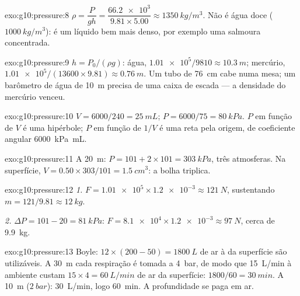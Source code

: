 \begin{solution}{exo:g10:pressure:8}
$\rho = \dfrac{P}{g h} = \dfrac{\num{66.2e3}}{9.81 \times 5.00}
\approx \qty{1350}{kg/m^3}$. Não é água doce ($\qty{1000}{kg/m^3}$): é um
líquido bem mais denso, por exemplo uma salmoura concentrada.
\end{solution}

\begin{solution}{exo:g10:pressure:9}
$h = P_0/(\rho g)$: água, $\num{1.01e5}/9810 \approx \qty{10.3}{m}$;
mercúrio, $\num{1.01e5}/(13600 \times 9.81) \approx \qty{0.76}{m}$. Um
tubo de \qty{76}{cm} cabe numa mesa; um barômetro de água de \qty{10}{m}
precisa de uma caixa de escada --- a densidade do mercúrio venceu.
\end{solution}

\begin{solution}{exo:g10:pressure:10}
$V = 6000/240 = \qty{25}{mL}$; $P = 6000/75 = \qty{80}{kPa}$. $P$ em
função de $V$ é uma hipérbole; $P$ em função de $1/V$ é uma reta pela
origem, de coeficiente angular \qty{6000}{kPa.mL}.
\end{solution}

\begin{solution}{exo:g10:pressure:11}
A \qty{20}{m}: $P = 101 + 2 \times 101 = \qty{303}{kPa}$, três
atmosferas. Na superfície,
$V = 0.50 \times 303/101 = \qty{1.5}{cm^3}$: a bolha triplica.
\end{solution}

\begin{solution}{exo:g10:pressure:12}
\emph{1.} $F = \num{1.01e5} \times \num{1.2e-3} \approx \qty{121}{N}$,
sustentando $m = 121/9.81 \approx \qty{12}{kg}$.

\emph{2.} $\Delta P = 101 - 20 = \qty{81}{kPa}$:
$F = \num{8.1e4} \times \num{1.2e-3} \approx \qty{97}{N}$, cerca de
\qty{9.9}{kg}.
\end{solution}

\begin{solution}{exo:g10:pressure:13}
Boyle: $12 \times (200 - 50) = \qty{1800}{L}$ de ar à  da
superfície são utilizáveis. A \qty{30}{m} cada respiração é tomada a
\qty{4}{bar}, de modo que \qty{15}{L/min} à  ambiente custam
$15 \times 4 = \qty{60}{L/min}$ de ar da superfície:
$1800/60 = \qty{30}{min}$. A \qty{10}{m} ($\qty{2}{bar}$):
\qty{30}{L/min}, logo \qty{60}{min}. A profundidade se paga em ar.
\end{solution}


